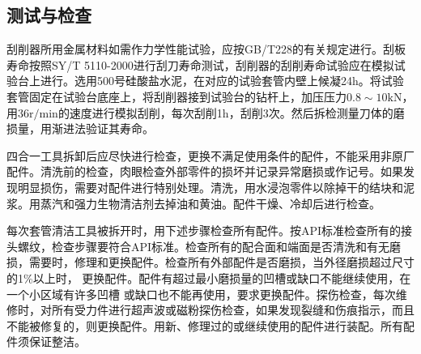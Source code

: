 \subsection{测试与检查}

刮削器所用金属材料如需作力学性能试验，应按GB/T228的有关规定进行。刮板寿命按照SY/T 5110-2000进行刮刀寿命测试，刮削器的刮削寿命试验应在模拟试验台上进行。选用500号硅酸盐水泥，在对应的试验套管内壁上候凝24h。将试验套管固定在试验台底座上，将刮削器接到试验台的钻杆上，加压压力$0.8\sim10\mathrm{kN}$，用$36\mathrm{r/min}$的速度进行模拟刮削，每次刮削1h，刮削3次。然后拆检测量刀体的磨损量，用渐进法验证其寿命。

四合一工具拆卸后应尽快进行检查，更换不满足使用条件的配件，不能采用非原厂配件。清洗前的检查，肉眼检查外部零件的损坏并记录异常磨损或作记号。如果发现明显损伤，需要对配件进行特别处理。清洗，用水浸泡零件以除掉干的结块和泥浆。用蒸汽和强力生物清洁剂去掉油和黄油。配件干燥、冷却后进行检查。

每次套管清洁工具被拆开时，用下述步骤检查所有配件。按API标准检查所有的接头螺纹，检查步骤要符合API标准。检查所有的配合面和端面是否清洗和有无磨损，需要时，修理和更换配件。检查所有外部配件是否磨损，当外径磨损超过尺寸的1\%以上时， 更换配件。配件有超过最小磨损量的凹槽或缺口不能继续使用，在一个小区域有许多凹槽 或缺口也不能再使用，要求更换配件。探伤检查，每次维修时，对所有受力件进行超声波或磁粉探伤检查，如果发现裂缝和伤痕指示，而且不能被修复的，则更换配件。用新、修理过的或继续使用的配件进行装配。所有配件须保证整洁。

